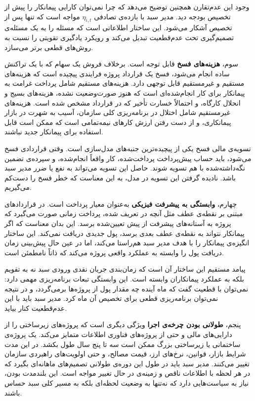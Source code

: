 وجود این عدم‌تقارن همچنین توضیح می‌دهد که چرا نمی‌توان کارایی
پیمانکار را پیش از تخصیص بودجه دید. مدیر سبد با بازده‌ی
تصادفی $\eta_{i,t}$ مواجه است که تنها پس از تخصیص آشکار
می‌شود. این ساختار اطلاعاتی است که مسئله را به یک مسئله‌ی
تصمیم‌گیری تحت عدم‌قطعیت تبدیل می‌کند و رویکرد یادگیری
تقویتی را نسبت به روش‌های قطعی برتر می‌سازد.

سوم، \textbf{هزینه‌های فسخ} قابل توجه است. برخلاف فروش یک سهام که
با یک تراکنش ساده انجام می‌شود، فسخ یک قرارداد پروژه فرایندی
پیچیده است که هزینه‌های مستقیم و غیرمستقیم قابل توجهی دارد.
هزینه‌های مستقیم شامل پرداخت غرامت به پیمانکار برای کار انجام‌شده‌ای
است که هنوز صورت‌وضعیت نشده، هزینه‌های بسیج و انحلال کارگاه، و
احتمالاً خسارت تأخیر که در قرارداد مشخص شده است. هزینه‌های غیرمستقیم
شامل اختلال در برنامه‌ریزی کلی سازمان، آسیب به شهرت در بازار
پیمانکاری، و از دست رفتن ارزش کارهای نیمه‌تمامی است که ممکن است
قابل استفاده برای پیمانکار جدید نباشند.

تسویه‌ی مالی فسخ یکی از پیچیده‌ترین جنبه‌های مدل‌سازی است. وقتی
قراردادی فسخ می‌شود، باید حساب پیش‌پرداخت پرداخت‌شده، کار
واقعاً انجام‌شده، و سپرده‌ی تضمین نگه‌داشته‌شده با هم تسویه شوند.
حاصل این تسویه می‌تواند به نفع یا ضرر مدیر سبد باشد. نادیده
گرفتن این تسویه در مدل، به این معناست که خطر فسخ را دست‌کم
می‌گیریم.

چهارم، \textbf{وابستگی به پیشرفت فیزیکی} به‌عنوان معیار پرداخت
است. در قراردادهای مبتنی بر نقطه‌ی عطف مثل آنچه در 
تعریف شده، پرداخت زمانی صورت می‌گیرد که پروژه به آستانه‌های پیشرفت
از پیش تعیین‌شده برسد. این بدان معناست که اگر پیمانکار نتواند به
نقطه‌ی عطف بعدی برسد، پول جدیدی دریافت نمی‌کند. این ساختار
انگیزه‌ی پیمانکار را با هدف مدیر سبد هم‌راستا می‌کند، اما در عین
حال پیش‌بینی زمان دریافت پول را وابسته به عملکرد واقعی پروژه می‌کند
که ذاتاً نامطمئن است.

پیامد مستقیم این ساختار آن است که زمان‌بندی جریان نقدی ورودی سبد
نه به تقویم بلکه به عملکرد پیمانکاران وابسته است. این وابستگی
تبعات برنامه‌ریزی مهمی دارد: نمی‌توان با قطعیت گفت که ماه آینده
چه مقدار پول از پروژه‌ها برمی‌گردد، و در نتیجه نمی‌توان برنامه‌ریزی
قطعی برای تخصیص آن ماه کرد. مدیر سبد باید با این عدم‌قطعیت کنار بیاید.

پنجم، \textbf{طولانی بودن چرخه‌ی اجرا} ویژگی دیگری است که
پروژه‌های زیرساختی را از دارایی‌های مالی و حتی از پروژه‌های
فناوری اطلاعات متمایز می‌کند. یک پروژه‌ی ساختمانی یا
زیرساختی بزرگ ممکن است سه تا پنج سال طول بکشد. در این مدت
شرایط بازار، قوانین، نرخ‌های ارز، قیمت مصالح، و حتی اولویت‌های
راهبردی سازمان تغییر می‌کنند. مدیر سبد باید در طول این دوره‌ی
طولانی تصمیم‌های ماهانه‌ای بگیرد که در هر لحظه با اطلاعات
ناقص و زمینه‌ی در حال تغییر مواجه است. این بلندمدت بودن، نیاز
به سیاست‌هایی دارد که نه‌تنها به وضعیت لحظه‌ای بلکه به مسیر
کلی سبد حساس باشند.

